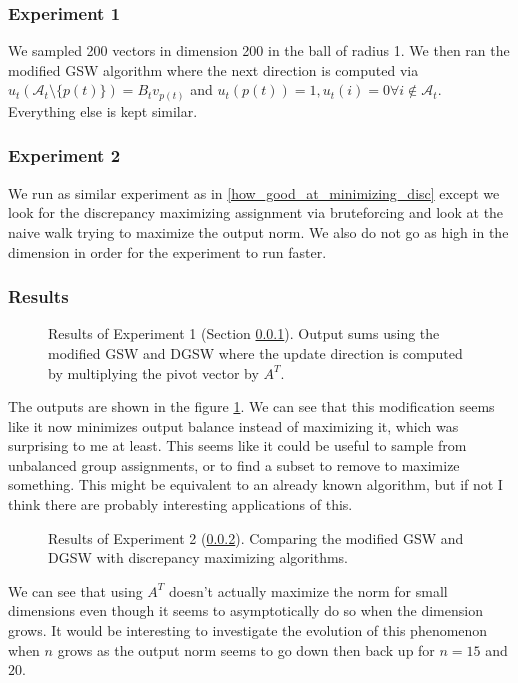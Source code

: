 \documentclass[12pt]{article}
\begin{document}
\subsubsection{Experiment 1}\label{exp1_A_T}

We sampled 200 vectors in dimension 200 in the ball of radius 1. We then ran the modified GSW algorithm where the next direction is computed via $u_t(\mathcal{A}_t\setminus\{p(t)\})=B_tv_{p(t)}$ and $u_t(p(t))=1, u_t(i)=0 \forall i\not\in\mathcal{A}_t$. Everything else is kept similar. 

\subsubsection{Experiment 2}\label{exp2_A_T}


We run as similar experiment as in \ref{how_good_at_minimizing_disc} except we look for the discrepancy maximizing assignment via bruteforcing and look at the naive walk trying to maximize the output norm. We also do not go as high in the dimension in order for the experiment to run faster.

\subsubsection{Results}
\begin{figure}[h]
\centering

\caption{Results of Experiment 1 (Section \ref{exp1_A_T}). Output sums using the modified GSW and DGSW where the update direction is computed by multiplying the pivot vector by $A^T$.}
\label{A_T_instead_of_lstsq}
\end{figure}
The outputs are shown in the figure \ref{A_T_instead_of_lstsq}. We can see that this modification seems like it now minimizes output balance instead of maximizing it, which was surprising to me at least. This seems like it could be useful to sample from unbalanced group assignments, or to find a subset to remove to maximize something. This might be equivalent to an already known algorithm, but if not I think there are probably interesting applications of this.

\begin{figure}[h]
\centering

\caption{Results of Experiment 2 (\ref{exp2_A_T}). Comparing the modified GSW and DGSW with discrepancy maximizing algorithms.}
\label{A_T_instead_of_lstsq_2}
\end{figure}
We can see that using $A^T$ doesn't actually maximize the norm for small dimensions even though it seems to asymptotically do so when the dimension grows. It would be interesting to investigate the evolution of this phenomenon when $n$ grows as the output norm seems to go down then back up for $n=15$ and $20$.
\end{document}
